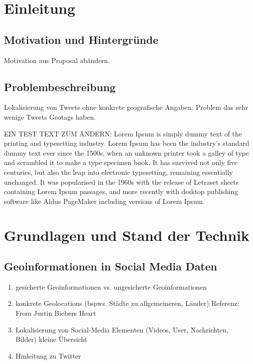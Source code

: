 \chapter{Einleitung}

\section{Motivation und Hintergründe}
Motivation aus Proposal abändern.

\section{Problembeschreibung} Lokalisierung von Tweets ohne konkrete geografische Angaben. Problem
das sehr wenige Tweets Geotags haben.

EIN TEST TEXT ZUM ÄNDERN: Lorem Ipsum is simply dummy text of the printing and typesetting industry.
Lorem Ipsum has been the industry's standard dummy text ever since the 1500s, when an unknown
printer took a galley of type and scrambled it to make a type specimen book. It has survived not
only five centuries, but also the leap into electronic typesetting, remaining essentially unchanged.
It was popularised in the 1960s with the release of Letraset sheets containing Lorem Ipsum passages,
and more recently with desktop publishing software like Aldus PageMaker including versions of Lorem
Ipsum.

\chapter{Grundlagen und Stand der Technik}
	\section{Geoinformationen in Social Media Daten}
 		\begin{enumerate}
 			\item {} gesicherte Geoinformationen vs. ungesicherte Geoinformationen
 			\item konkrete Geolocations (bspws. Städte zu allgemeineren, Länder) Referenz: From Justin Biebers Heart 
 			\item Lokalisierung von Social-Media Elementen (Videos, User, Nachrichten, Bilder) kleine Übersicht
 			\item Hinleitung zu Twitter  
 		\end{enumerate}

